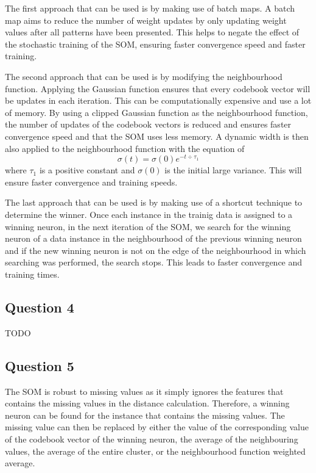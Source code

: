 \documentclass[10pt]{article}
\begin{document}
The first approach that can be used is by making use of batch maps. A batch map aims to reduce
the number of weight updates by only updating weight values after all patterns have been presented.
This helps to negate the effect of the stochastic training of the SOM, ensuring faster convergence
speed and faster training.

The second approach that can be used is by modifying the neighbourhood function. Applying the
Gaussian function ensures that every codebook vector will be updates in each iteration.
This can be computationally expensive and use a lot of memory. By using a clipped Gaussian function
as the neighbourhood function, the number of updates of the codebook vectors is reduced and ensures
faster convergence speed and that the SOM uses less memory. A dynamic width is then also applied to
the neighbourhood function with the equation of
\begin{equation*}
    \sigma (t) = \sigma(0)e^{-t \div \tau_1}
\end{equation*}
where $\tau_1$ is a positive constant and $\sigma(0)$ is the initial large variance.
This will ensure faster convergence and training speeds.

The last approach that can be used is by making use of a shortcut technique to determine the winner.
Once each instance in the trainig data is assigned to a winning neuron, in the next iteration
of the SOM, we search for the winning neuron of a data instance in the neighbourhood of the
previous winning neuron and if the new winning neuron is not on the edge of the neighbourhood in
which searching was performed, the search stops. This leads to faster convergence and training times.

\subsection*{Question 4}

TODO

\subsection*{Question 5}

The SOM is robust to missing values as it simply ignores the features that contains the missing values
in the distance calculation. Therefore, a winning neuron can be found for the instance that contains
the missing values. The missing value can then be replaced by either the value of the corresponding
value of the codebook vector of the winning neuron, the average of the neighbouring values, the average
of the entire cluster, or the neighbourhood function weighted average.
\end{document}
